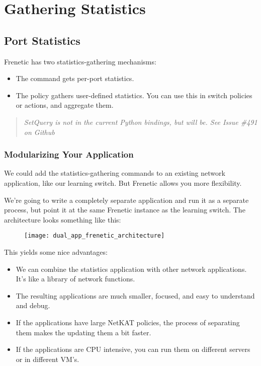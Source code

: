 
\chapter{Gathering Statistics}
\label{chapter:statistics}

\section{Port Statistics}

Frenetic has two statistics-gathering mechanisms:

\begin{itemize}
\item The  command gets per-port statistics.
\item The  policy gathers user-defined statistics.  You can use this in switch
policies or  actions, and aggregate them.
\end{itemize}

\begin{quotation}
\emph{SetQuery is not in the current Python bindings, but will be.  See Issue \#491 on Github}
\end{quotation}

\subsection{Modularizing Your Application}

We could add the statistics-gathering commands to an existing network application, like our learning
switch.  But Frenetic allows you more flexibility.   

We're going to write a completely separate application and run it as a separate process, but point it
at the same Frenetic instance as the learning switch.  The architecture looks something like this:

\begin{figure}[h]
\centering
\texttt{[image: dual\_app\_frenetic\_architecture]}
\end{figure}

This yields some nice advantages:

\begin{itemize}
\item We can combine the statistics application with other network applications.  It's like a 
library of network functions.
\item The resulting applications are much smaller, focused, and easy to understand and debug.
\item If the applications have large NetKAT policies, the process of separating them makes the 
updating them a bit faster.
\item If the applications are CPU intensive, you can run them on different servers or in different VM's.
\end{itemize}

